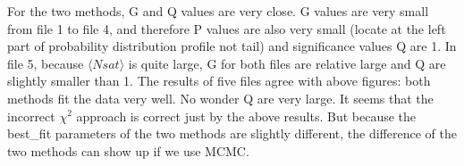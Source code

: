 For the two methods, G and Q values are very close. G values are very small from file 1 to file 4, and therefore P values are also very small (locate at the left part of probability distribution profile not tail) and significance values Q are 1. In file 5, because $\langle Nsat \rangle$ is quite large, G for both files are relative large and Q are slightly smaller than 1. The results of five files agree with above figures: both methods fit the data very well.  No wonder Q are very large. It seems that the incorrect $\chi^2$ approach is correct just by the above results. But because the best\_fit parameters of the two methods are slightly different, the difference of the two methods can show up if we use MCMC.
